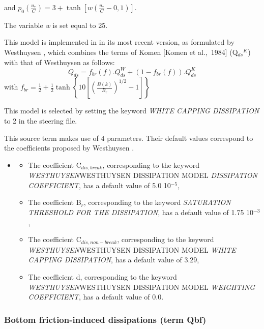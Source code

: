  and $p_{0} \left(\frac{u_{*} }{C} \right)=3+\tanh \left[w\left(\frac{u_{*} }{C} -0,1\right)\right]$.

 The variable \textit{w} is set equal to 25.

 This model is implemented in \tomawac in its most recent version, as formulated by Westhuysen \cite{Westhuys2008}, which combines the terms of Komen [Komen et al.,~1984] (Q${}_{ds}$${}^{K}$) with that of Westhuysen \cite{Westhuys2007} as follows:
\begin{equation} \label{GrindEQ__4_41_}
Q_{ds} =f_{br} (f).Q_{ds} ^{W} +\left(1-f_{br} (f)\right).Q_{ds} ^{K}
\end{equation}
with $f_{br} =\frac{1}{2} +\frac{1}{2} \tanh \left\{10\left[\left(\frac{B(k)}{B_{r} } \right)^{1/2} -1\right]\right\}$

 This model is selected by setting the keyword \textit{WHITE CAPPING DISSIPATION} to 2 in the steering file.\textbf{}

 This source term makes use of 4 parameters. Their default values correspond to the coefficients proposed by Westhuysen  \cite{Westhuys2008}.

\begin{itemize}
\item \begin{itemize}
\item  The coefficient C${}_{dis,break}$, corresponding to the keyword \textit{WESTHUYSEN}WESTHUYSEN DISSIPATION MODEL\textit{ DISSIPATION COEFFICIENT}, has a default value of 5.0 10${}^{-5}$,

\item  The coefficient B${}_{r}$, corresponding to the keyword \textit{SATURATION THRESHOLD FOR THE DISSIPATION}, has a default value of 1.75 10${}^{-3}$,

\item  The coefficient C${}_{dis,non-break}$, corresponding to the keyword \textit{WESTHUYSEN}WESTHUYSEN DISSIPATION MODEL\textit{ WHITE CAPPING DISSIPATION}, has a default value of 3.29,

\item  The coefficient d, corresponding to the keyword \textit{WESTHUYSEN}WESTHUYSEN DISSIPATION MODEL\textit{ WEIGHTING COEFFICIENT}, has a default value of 0.0.
\end{itemize}
\end{itemize}




\subsubsection{ Bottom friction-induced dissipations (term Qbf)}

